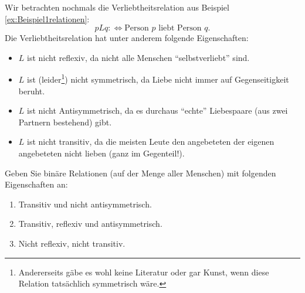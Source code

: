     \begin{bsp}
        Wir betrachten nochmals die Verliebtheitsrelation aus Beispiel \ref{ex:Beispiel1relationen}:
        \[
        pLq:\Leftrightarrow \text{Person $p$ liebt Person $q$.}
        \]
    Die Verliebtheitsrelation hat unter anderem folgende Eigenschaften:
    \begin{itemize}
        \item $L$ ist nicht reflexiv, da nicht alle Menschen ``selbstverliebt'' sind.
        \item $L$ ist (leider\footnote{Andererseits gäbe es wohl keine Literatur oder gar Kunst, wenn diese Relation tatsächlich symmetrisch wäre.}) nicht symmetrisch, da Liebe nicht immer auf Gegenseitigkeit beruht.
        \item $L$ ist nicht Antisymmetrisch, da es durchaus ``echte'' Liebespaare (aus zwei Partnern bestehend) gibt.
        \item $L$ ist nicht transitiv, da die meisten Leute den angebeteten der eigenen angebeteten nicht lieben (ganz im Gegenteil!).
    \end{itemize}
    \end{bsp}

    \begin{ueb}
        Geben Sie binäre Relationen (auf der Menge aller Menschen) mit folgenden Eigenschaften an:
        \begin{enumerate}
            \item Transitiv und nicht antisymmetrisch.
            \item Transitiv, reflexiv und antisymmetrisch.
            \item Nicht reflexiv, nicht transitiv.
        \end{enumerate}
    \end{ueb}
    \begin{lsg}
    \end{lsg}


